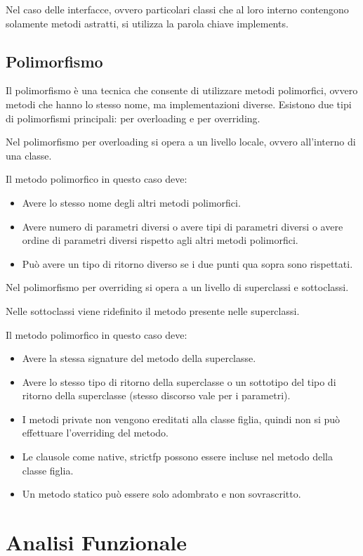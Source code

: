\documentclass[a4paper,12pt,times,numbered,print,index]{article}
\begin{document}
Nel caso delle interfacce, ovvero particolari classi che al loro interno contengono solamente metodi astratti, si utilizza la parola chiave implements.
\textcite{corsoinformatica}

\subsection{Polimorfismo}
Il polimorfismo è una tecnica che consente di utilizzare metodi polimorfici, ovvero metodi che hanno lo stesso nome, ma implementazioni diverse.
Esistono due tipi di polimorfismi principali: per overloading e per overriding.

Nel polimorfismo per overloading si opera a un livello locale, ovvero all’interno di una classe.

Il metodo polimorfico in questo caso deve:
\begin{itemize}
	\item Avere lo stesso nome degli altri metodi polimorfici.
	\item Avere numero di parametri diversi o avere tipi di parametri diversi o avere ordine di parametri diversi rispetto agli altri metodi polimorfici.
	\item Può avere un tipo di ritorno diverso se i due punti qua sopra sono rispettati.
\end{itemize}
Nel polimorfismo per overriding si opera a un livello di superclassi e sottoclassi.

Nelle sottoclassi viene ridefinito il metodo presente nelle superclassi.

Il metodo polimorfico in questo caso deve:
\begin{itemize}
	\item Avere la stessa signature del metodo della superclasse.
	\item Avere lo stesso tipo di ritorno della superclasse o un sottotipo del tipo di ritorno della superclasse (stesso discorso vale per i parametri).
	\item I metodi private non vengono ereditati alla classe figlia, quindi non si può effettuare l’overriding del metodo.
	\item Le clausole come native, strictfp possono essere incluse nel metodo della classe figlia.
	\item Un metodo statico può essere solo adombrato e non sovrascritto.
\end{itemize}
\textcite{polimorfismo}


\section{Analisi Funzionale}
\end{document}
